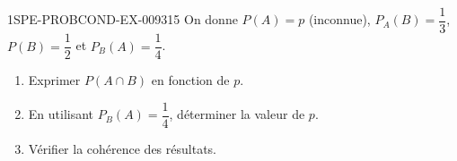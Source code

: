 \begin{exercice}{1SPE-PROBCOND-EX-009}{3}{15}
On donne $P(A) = p$ (inconnue), $P_A(B) = \dfrac{1}{3}$, $P(B) = \dfrac{1}{2}$ et $P_B(A) = \dfrac{1}{4}$.

\begin{enumerate}
  \item Exprimer $P(A \cap B)$ en fonction de $p$.
  \item En utilisant $P_B(A) = \dfrac{1}{4}$, déterminer la valeur de $p$.
  \item Vérifier la cohérence des résultats.
\end{enumerate}
\end{exercice}
